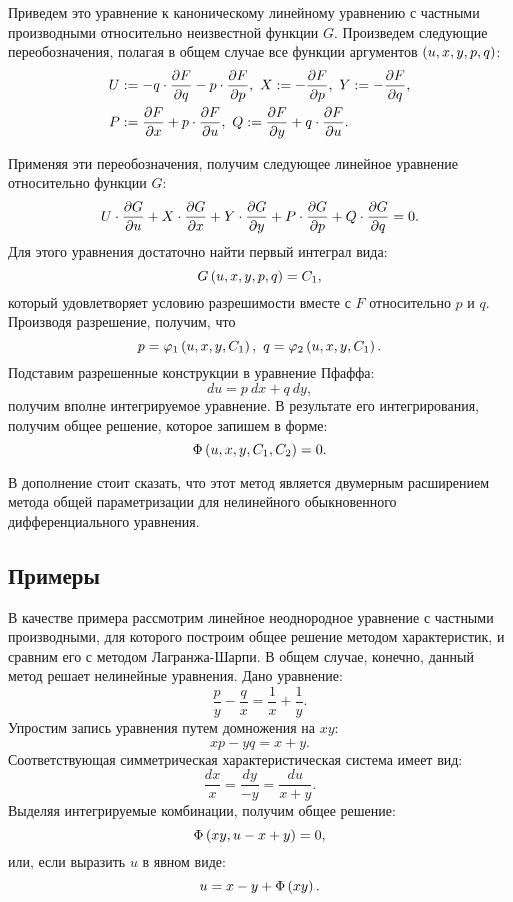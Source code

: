 	Приведем это уравнение к каноническому линейному уравнению с частными производными относительно неизвестной функции $G$. Произведем следующие переобозначения, полагая в общем случае все функции аргументов $\left( u, x, y, p, q \right)$:
	\[ \begin{split}
		U &:= -q \cdot \dfrac{\partial F}{\partial q} - p \cdot \dfrac{\partial F}{\partial p}, ~ X := -\dfrac{\partial F}{\partial p}, ~ Y := -\dfrac{\partial F}{\partial q}, \\ 
		P &:= \dfrac{\partial F}{\partial x} + p \cdot \dfrac{\partial F}{\partial u}, ~ Q := \dfrac{\partial F}{\partial y} + q \cdot \dfrac{\partial F}{\partial u}.
	\end{split} \]

	Применяя эти переобозначения, получим следующее линейное уравнение относительно функции $G$:
	\[ U \cdot \dfrac{\partial G}{\partial u} + X \cdot \dfrac{\partial G}{\partial x} + Y \cdot \dfrac{\partial G}{\partial y} + P \cdot \dfrac{\partial G}{\partial p} + Q \cdot \dfrac{\partial G}{\partial q} = 0. \]
	Для этого уравнения достаточно найти первый интеграл вида:
	\[ G \left( u, x, y, p, q \right) = C_1, \]
	который удовлетворяет условию разрешимости вместе с $F$ относительно $p$ и $q$. Производя разрешение, получим, что
	\[ p = \varphi_1 \left( u, x, y, C_1 \right), ~ q = \varphi_2 \left( u, x, y, C_1 \right). \]
	Подставим разрешенные конструкции в уравнение Пфаффа:
	\[ du = p ~ dx + q ~ dy, \]
	получим вполне интегрируемое уравнение. В результате его интегрирования, получим общее решение, которое запишем в форме:
	\[ \Phi \left( u, x, y, C_1, C_2 \right) = 0. \]

	В дополнение стоит сказать, что этот метод является двумерным расширением метода общей параметризации для нелинейного обыкновенного дифференциального уравнения.

	\subsection{Примеры}

		В качестве примера рассмотрим линейное неоднородное уравнение с частными производными, для которого построим общее решение методом характеристик, и сравним его с методом Лагранжа-Шарпи. В общем случае, конечно, данный метод решает нелинейные уравнения. Дано уравнение:
		\[ \frac{p}{y} - \frac{q}{x} = \frac{1}{x} + \frac{1}{y}. \]
		Упростим запись уравнения путем домножения на $xy$:
		\[ xp - yq = x + y. \]
		Соответствующая симметрическая характеристическая система имеет вид:
		\[ \frac{dx}{x} = \frac{dy}{-y} = \frac{du}{x+y}. \]
		Выделяя интегрируемые комбинации, получим общее решение:
		\[ \Phi \left( xy, u - x + y \right) = 0, \]
		или, если выразить $u$ в явном виде:
		\[ u = x - y + \Phi \left( xy \right). \]


